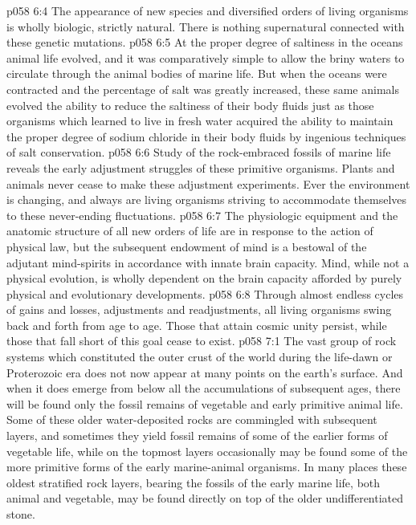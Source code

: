 \vs p058 6:4 The  appearance of new species and diversified orders of living organisms is wholly biologic, strictly natural. There is nothing supernatural connected with these genetic mutations.
\vs p058 6:5 At the proper degree of saltiness in the oceans animal life evolved, and it was comparatively simple to allow the briny waters to circulate through the animal bodies of marine life. But when the oceans were contracted and the percentage of salt was greatly increased, these same animals evolved the ability to reduce the saltiness of their body fluids just as those organisms which learned to live in fresh water acquired the ability to maintain the proper degree of sodium chloride in their body fluids by ingenious techniques of salt conservation.
\vs p058 6:6 Study of the rock\hyp{}embraced fossils of marine life reveals the early adjustment struggles of these primitive organisms. Plants and animals never cease to make these adjustment experiments. Ever the environment is changing, and always are living organisms striving to accommodate themselves to these never\hyp{}ending fluctuations.
\vs p058 6:7 The physiologic equipment and the anatomic structure of all new orders of life are in response to the action of physical law, but the subsequent endowment of mind is a bestowal of the adjutant mind\hyp{}spirits in accordance with innate brain capacity. Mind, while not a physical evolution, is wholly dependent on the brain capacity afforded by purely physical and evolutionary developments.
\vs p058 6:8 Through almost endless cycles of gains and losses, adjustments and readjustments, all living organisms swing back and forth from age to age. Those that attain cosmic unity persist, while those that fall short of this goal cease to exist.
\vs p058 7:1 The vast group of rock systems which constituted the outer crust of the world during the life\hyp{}dawn or Proterozoic era does not now appear at many points on the earth’s surface. And when it does emerge from below all the accumulations of subsequent ages, there will be found only the fossil remains of vegetable and early primitive animal life. Some of these older water\hyp{}deposited rocks are commingled with subsequent layers, and sometimes they yield fossil remains of some of the earlier forms of vegetable life, while on the topmost layers occasionally may be found some of the more primitive forms of the early marine\hyp{}animal organisms. In many places these oldest stratified rock layers, bearing the fossils of the early marine life, both animal and vegetable, may be found directly on top of the older undifferentiated stone.
